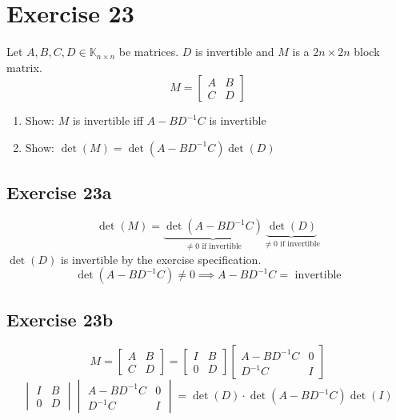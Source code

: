 \documentclass[a4paper]{article}
\theoremstyle{definition}
\begin{document}
\section{Exercise 23}
\begin{ex}
  Let $A, B, C, D \in \mathbb K_{n\times n}$ be matrices.
  $D$ is invertible and $M$ is a $2n \times 2n$ block matrix.
  \[ M = \begin{bmatrix} A & B \\ C & D \end{bmatrix} \]
  \begin{enumerate}
    \item Show: $M$ is invertible iff $A - BD^{-1}C$ is invertible
    \item Show: $\det(M) = \det(A - BD^{-1} C) \det(D)$
  \end{enumerate}
\end{ex}

\subsection{Exercise 23a}
\[ \det(M) = \underbrace{\det(A - BD^{-1} C)}_{\neq 0 \text{ if invertible}} \underbrace{\det(D)}_{\neq 0 \text{ if invertible}} \]
$\det(D)$ is invertible by the exercise specification.
\[ \det(A - BD^{-1} C) \neq 0 \implies A - BD^{-1} C = \text{ invertible} \]

\subsection{Exercise 23b}
\[
  M = \begin{bmatrix} A & B \\ C & D \end{bmatrix}
  = \begin{bmatrix} I & B \\ 0 & D \end{bmatrix} \begin{bmatrix} A-BD^{-1}C & 0 \\ D^{-1}C & I \end{bmatrix}
\] \[
  \begin{vmatrix} I & B \\ 0 & D \end{vmatrix}
  \begin{vmatrix} A - BD^{-1} C & 0 \\ D^{-1} C & I \end{vmatrix}
  = \det(D) \cdot \det(A - BD^{-1}C) \det(I)
\]
\end{document}
